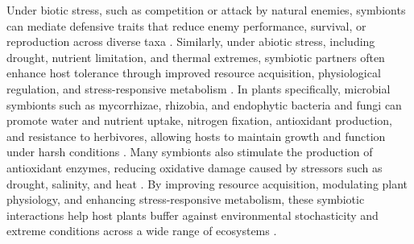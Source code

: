 \documentclass[12pt]{article}\usepackage[]{graphicx}\usepackage[dvipsnames]{xcolor}
\begin{document}
Under biotic stress, such as competition or attack by natural enemies, symbionts can mediate defensive traits that reduce enemy performance, survival, or reproduction across diverse taxa \citep{atala2022fungal,bastias2017epichloe,vega2008insect,haine2008symbiont,florez2015defensive}.
Similarly, under abiotic stress, including drought, nutrient limitation, and thermal extremes, symbiotic partners often enhance host tolerance through improved resource acquisition, physiological regulation, and stress-responsive metabolism \citep{clay2002evolutionary, afkhami2008symbiosis,cesar2024defensive}. 
In plants specifically, microbial symbionts such as mycorrhizae, rhizobia, and endophytic bacteria and fungi can promote water and nutrient uptake, nitrogen fixation, antioxidant production, and resistance to herbivores, allowing hosts to maintain growth and function under harsh conditions \citep{amijee1989development,van2015mycorrhiza,friesen2011microbiallyl}.
Many symbionts also stimulate the production of antioxidant enzymes, reducing oxidative damage caused by stressors such as drought, salinity, and heat \citep{ruiz1996superoxide}. 
By improving resource acquisition, modulating plant physiology, and enhancing stress-responsive metabolism, these symbiotic interactions help host plants buffer against environmental stochasticity and extreme conditions across a wide range of ecosystems \citep{fowler2023geographic,rudgers2020climate,li2026climate}.
\end{document}
